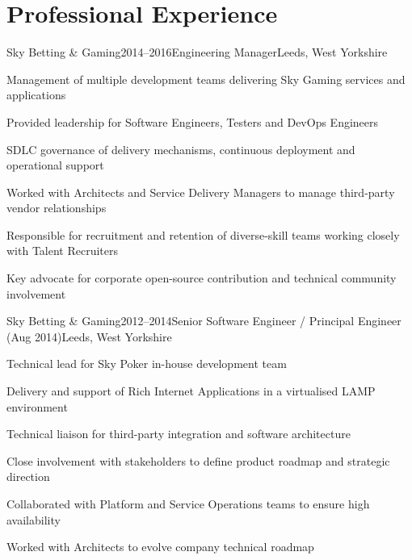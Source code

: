\documentclass{cv}
\begin{document}

\section{Professional Experience}


\begin{experience}{Sky Betting \& Gaming}{2014--2016}{Engineering Manager}{Leeds, West Yorkshire}
\item Management of multiple development teams delivering Sky Gaming services and applications
\item Provided leadership for Software Engineers, Testers and DevOps Engineers
\item SDLC governance of delivery mechanisms, continuous deployment and operational support
\item Worked with Architects and Service Delivery Managers to manage third-party vendor relationships
\item Responsible for recruitment and retention of diverse-skill teams working closely with Talent Recruiters
\item Key advocate for corporate open-source contribution and technical community involvement
\end{experience}


\begin{experience}{Sky Betting \& Gaming}{2012--2014}{Senior Software Engineer / Principal Engineer (Aug 2014)}{Leeds, West Yorkshire}
\item Technical lead for Sky Poker in-house development team
\item Delivery and support of Rich Internet Applications in a virtualised LAMP environment
\item Technical liaison for third-party integration and software architecture
\item Close involvement with stakeholders to define product roadmap and strategic direction
\item Collaborated with Platform and Service Operations teams to ensure high availability
\item Worked with Architects to evolve company technical roadmap
\end{experience}
\end{document}
